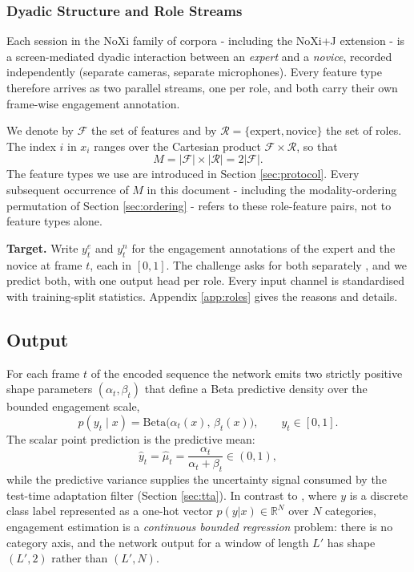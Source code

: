 \documentclass[10pt,a4paper,twocolumn]{article}
\newcommand{\R}{\mathbb{R}}
\begin{document}
	\subsubsection{Dyadic Structure and Role Streams}
	Each session in the NoXi \cite{cafaro2017noxi} family of corpora - including the NoXi+J extension \cite{funk2024noxij} - is a screen-mediated dyadic interaction between an \emph{expert} and a \emph{novice}, recorded independently (separate cameras, separate microphones). Every feature type therefore arrives as two parallel streams, one per role, and both carry their own frame-wise engagement annotation.
	
	We denote by $\mathcal{F}$ the set of features and by $\mathcal{R}=\{\text{expert},\text{novice}\}$ the set of roles. The index $i$ in $x_i$ ranges over the Cartesian product $\mathcal{F}\times\mathcal{R}$, so that
	$$M = |\mathcal{F}| \times |\mathcal{R}| = 2|\mathcal{F}|.$$
	The feature types we use are introduced in Section \ref{sec:protocol}. Every subsequent occurrence of $M$ in this document - including the modality-ordering permutation of Section \ref{sec:ordering} - refers to these role-feature pairs, not to feature types alone.
	
	\textbf{Target.} Write $y^{e}_t$ and $y^{n}_t$ for the engagement annotations of the expert and the novice at frame $t$, each in $[0,1]$. The challenge asks for both separately \cite{withanage25}, and we predict both, with one output head per role. Every input channel is standardised with training-split statistics. Appendix \ref{app:roles} gives the reasons and details.

	\subsection{Output}
	For each frame $t$ of the encoded sequence the network emits two strictly positive shape parameters $(\alpha_t, \beta_t)$ that define a Beta predictive density over the bounded engagement scale,
	$$p(y_t \mid x) = \mathrm{Beta}\bigl(\alpha_t(x),\,\beta_t(x)\bigr), \qquad y_t \in [0,1].$$
	The scalar point prediction is the predictive mean:
	$$\hat{y}_t = \hat{\mu}_t = \frac{\alpha_t}{\alpha_t + \beta_t} \in (0,1),$$
	while the predictive variance supplies the uncertainty signal consumed by the test-time adaptation filter (Section \ref{sec:tta}). In contrast to \cite{ziyu2025}, where $y$ is a discrete class label represented as a one-hot vector $p(y|x)\in\R^{N}$ over $N$ categories, engagement estimation is a \emph{continuous bounded regression} problem: there is no category axis, and the network output for a window of length $L'$ has shape $(L', 2)$ rather than $(L', N)$.
	
\end{document}
